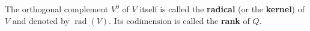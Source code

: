 The orthogonal complement $V^0$ of $V$ itself is called the \textbf{radical} (or the \textbf{kernel}) of $V$ and denoted by $\operatorname{rad}(V)$. Its codimension is called the \textbf{rank} of $Q$.
